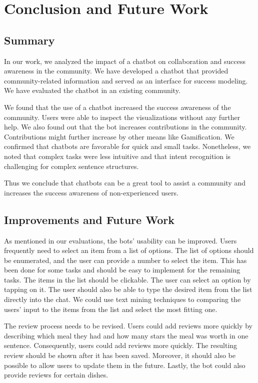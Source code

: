 \chapter{Conclusion and Future Work}

\section{Summary}
In our work, we analyzed the impact of a chatbot on collaboration and success awareness in the community. We have developed a chatbot that provided community-related information and served as an interface for success modeling.  We have evaluated the chatbot in an existing community.

We found that the use of a chatbot increased the success awareness of the community. Users were able to inspect the visualizations without any further help.
We also found out that the bot increases contributions in the community. Contributions might further increase by other means like Gamification. 
We confirmed that chatbots are favorable for quick and small tasks. Nonetheless, we noted that complex tasks were less intuitive and that intent recognition is challenging for complex sentence structures.

Thus we conclude that chatbots can be a great tool to assist a community and increases the success awareness of non-experienced users.  


\section{Improvements and Future Work}
As mentioned in our evaluations, the bots' usability can be improved.
Users frequently need to select an item from a list of options. 
The list of options should be enumerated, and the user can provide a number to select the item. This has been done for some tasks and should be easy to implement for the remaining tasks.
The items in the list should be clickable. The user can select an option by tapping on it.
The user should also be able to type the desired item from the list directly into the chat. We could use text mining techniques to comparing the users' input to the items from the list and select the most fitting one.

The review process needs to be revised. Users could add reviews more quickly by describing which meal they had and how many stars the meal was worth in one sentence. Consequently, users could add reviews more quickly. The resulting review should be shown after it has been saved. Moreover, it should also be possible to allow users to update them in the future. Lastly, the bot could also provide reviews for certain dishes.

